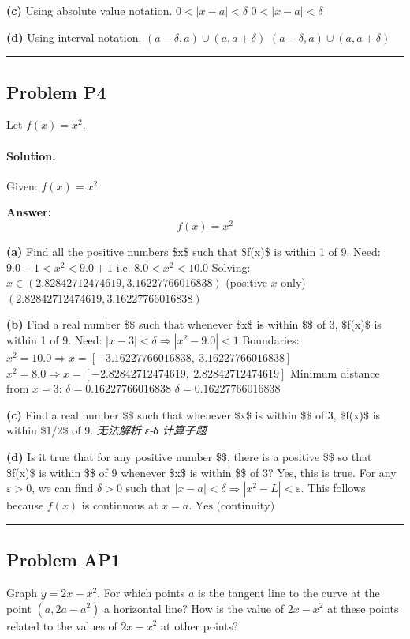 \documentclass[12pt, a4paper]{article}
\newcommand{\problem}[1]{\subsection*{Problem #1}}
\newcommand{\solution}{\paragraph{Solution.}}
\begin{document}
\textbf{(c)}
Using absolute value notation.
$0 < |x - a| < \delta$
$\boxed{0 < |x - a| < \delta}$

\textbf{(d)}
Using interval notation.
$(a - \delta, a) \cup (a, a + \delta)$
$\boxed{(a - \delta, a) \cup (a, a + \delta)}$

\vspace{1em}
\hrule
\vspace{1em}

\problem{P4}

Let $f(x) = x^2$.

\solution

Given: $f(x) = x^{2}$

\textbf{Answer:}
\[f(x) = x^{2}\]

\textbf{(a)}
Find all the positive numbers \$x\$ such that \$f(x)\$ is within 1 of 9.
Need: $9.0 - 1 < x^{2} < 9.0 + 1$
i.e. $8.0 < x^{2} < 10.0$
Solving: $x \in (2.82842712474619, 3.16227766016838)$ (positive $x$ only)
$\boxed{(2.82842712474619, 3.16227766016838)}$

\textbf{(b)}
Find a real number \$\delta\$ such that whenever \$x\$ is within \$\delta\$ of 3, \$f(x)\$ is within 1 of 9.
Need: $|x - 3| < \delta \Rightarrow |x^{2} - 9.0| < 1$
Boundaries: $x^{2} = 10.0 \Rightarrow x = \left[ -3.16227766016838, \  3.16227766016838\right]$
           $x^{2} = 8.0 \Rightarrow x = \left[ -2.82842712474619, \  2.82842712474619\right]$
Minimum distance from $x = 3$: $\delta = 0.16227766016838$
$\boxed{\delta = 0.16227766016838}$

\textbf{(c)}
Find a real number \$\delta\$ such that whenever \$x\$ is within \$\delta\$ of 3, \$f(x)\$ is within \$1/2\$ of 9.
\textit{\color{red} 无法解析 ε-δ 计算子题}

\textbf{(d)}
Is it true that for any positive number \$\varepsilon\$, there is a positive \$\delta\$ so that \$f(x)\$ is within \$\varepsilon\$ of 9 whenever \$x\$ is within \$\delta\$ of 3?
Yes, this is true.
For any $\varepsilon > 0$, we can find $\delta > 0$ such that
$|x - a| < \delta \Rightarrow |x^{2} - L| < \varepsilon$.
This follows because $f(x)$ is continuous at $x = a$.
$\boxed{\text{Yes (continuity)}}$

\vspace{1em}
\hrule
\vspace{1em}

\problem{AP1}

Graph $y = 2x - x^2$. For which points $a$ is the tangent line to the curve at the point $(a, 2a - a^2)$ a horizontal line? How is the value of $2x - x^2$ at these points related to the values of $2x - x^2$ at other points?
\end{document}
